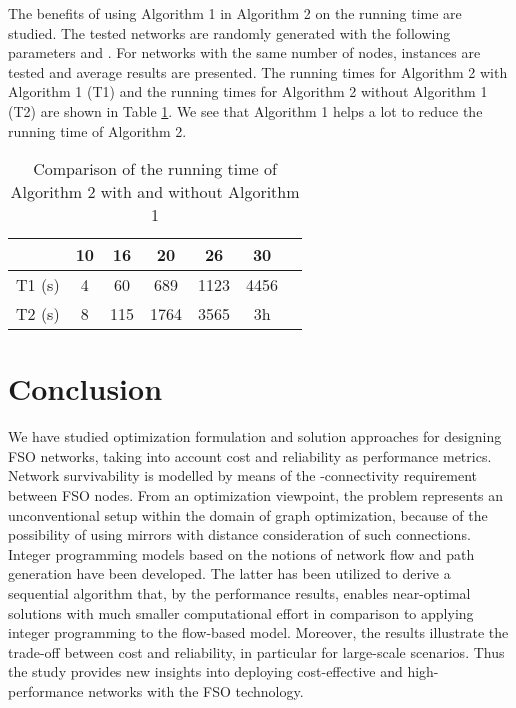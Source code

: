 \documentclass[onecolumn,11pt,draftclsnofoot]{IEEEtran}
\begin{document}
The benefits of using Algorithm 1 in Algorithm 2 on the running time are studied.
The tested networks are randomly generated with the following parameters  and . For networks with the same number of nodes,  instances are tested and average results are presented. The running times for Algorithm 2 with Algorithm 1 (T1) and the running times for Algorithm 2 without Algorithm 1 (T2) are shown in Table \ref{tab:algorithm1}. We see that Algorithm 1 helps a lot to reduce the running time of Algorithm 2.

\begin{table}[!htbp]
\setlength{\tabcolsep}{17pt}
\center
\caption{Comparison of the running time of Algorithm 2 with and without Algorithm 1}
\label{tab:algorithm1}
\begin{tabular}{|c|c|c|c|c|c|c|}
\hline
         & 10 & 16 & 20 & 26 & 30\\
\hline
T1 (s)  & 4  &60  &689  &1123 &4456\\
\hline
T2 (s)  & 8  &115  &1764  &3565  &3h\\
\hline
\end{tabular}
\hfill
\end{table}

\section{Conclusion} \label{sec:conclusion}
We have studied optimization formulation and solution approaches for designing FSO networks, taking into account cost and reliability as performance metrics. Network survivability is modelled by means of the -connectivity requirement between FSO nodes. From an optimization viewpoint, the problem represents an unconventional setup within the domain of graph optimization, because of the possibility of using mirrors with distance consideration of such connections. Integer programming models based on the notions of network flow and path generation have been developed. The latter has been utilized to derive a sequential algorithm that, by the performance results, enables near-optimal solutions with much smaller computational effort in comparison to applying integer programming to the flow-based model. Moreover, the results illustrate the trade-off between cost and reliability, in particular for large-scale scenarios. Thus the study provides new insights into deploying cost-effective and high-performance networks with the FSO technology.



\end{document}
